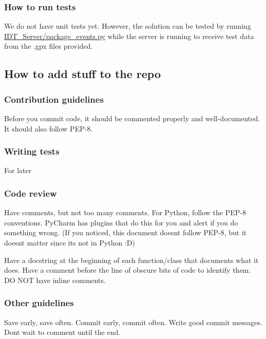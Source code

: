 \subsubsection*{How to run tests}

We do not have unit tests yet. However, the solution can be tested by running {\ttfamily \hyperlink{package__events_8py}{I\+D\+T\+\_\+\+Server/package\+\_\+events.\+py}} while the server is running to receive test data from the {\ttfamily .gpx} files provided.

\subsection*{How to add stuff to the repo}

\subsubsection*{Contribution guidelines}

Before you commit code, it should be commented properly and well-\/documented. It should also follow P\+E\+P-\/8.

\subsubsection*{Writing tests}

For later

\subsubsection*{Code review}

Have comments, but not too many comments. For Python, follow the P\+E\+P-\/8 conventions. Py\+Charm has plugins that do this for you and alert if you do something wrong. (If you noticed, this document doesn\textquotesingle{}t follow P\+E\+P-\/8, but it doesn\textquotesingle{}t matter since it\textquotesingle{}s not in Python \+:D)

Have a docstring at the beginning of each function/class that documents what it does. Have a comment before the line of obscure bits of code to identify them. DO N\+OT have inline comments.

\subsubsection*{Other guidelines}

Save early, save often. Commit early, commit often. Write good commit messages. Don\textquotesingle{}t wait to comment until the end. 